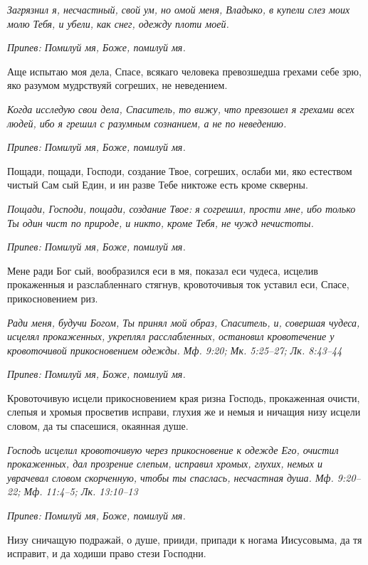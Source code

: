 \itshape Загрязнил я, несчастный, свой ум, но омой меня, Владыко, в купели слез моих молю Тебя, и убели, как снег, одежду плоти моей.\normalfont{}


\itshape Припев:\normalfont{} Помилуй мя, Боже, помилуй мя.


Аще испытаю моя дела, Спасе, всякаго человека превозшедша грехами себе зрю, яко разумом мудрствуяй согреших, не неведением.


\itshape Когда исследую свои дела, Спаситель, то вижу, что превзошел я грехами всех людей, ибо я грешил с разумным сознанием, а не по неведению.\normalfont{}


\itshape Припев:\normalfont{} Помилуй мя, Боже, помилуй мя.


Пощади, пощади, Господи, создание Твое, согреших, ослаби ми, яко естеством чистый Сам сый Един, и ин разве Тебе никтоже есть кроме скверны.


\itshape Пощади, Господи, пощади, создание Твое: я согрешил, прости мне, ибо только Ты один чист по природе, и никто, кроме Тебя, не чужд нечистоты.\normalfont{}


\itshape Припев:\normalfont{} Помилуй мя, Боже, помилуй мя.


Мене ради Бог сый, вообразился еси в мя, показал еси чудеса, исцелив прокаженныя и разслабленнаго стягнув, кровоточивыя ток уставил еси, Спасе, прикосновением риз.


\itshape Ради меня, будучи Богом, Ты принял мой образ, Спаситель, и, совершая чудеса, исцелял прокаженных, укреплял расслабленных, остановил кровотечение у кровоточивой прикосновением одежды. Мф. 9:20; Мк. 5:25–27; Лк. 8:43–44\normalfont{}


\itshape Припев:\normalfont{} Помилуй мя, Боже, помилуй мя.


Кровоточивую исцели прикосновением края ризна Господь, прокаженная очисти, слепыя и хромыя просветив исправи, глухия же и немыя и ничащия низу исцели словом, да ты спасешися, окаянная душе.


\itshape Господь исцелил кровоточивую через прикосновение к одежде Его, очистил прокаженных, дал прозрение слепым, исправил хромых, глухих, немых и уврачевал словом скорченную, чтобы ты спаслась, несчастная душа. Мф. 9:20–22; Мф. 11:4–5; Лк. 13:10–13\normalfont{}


\itshape Припев:\normalfont{} Помилуй мя, Боже, помилуй мя.


Низу сничащую подражай, о душе, прииди, припади к ногама Иисусовыма, да тя исправит, и да ходиши право стези Господни.


